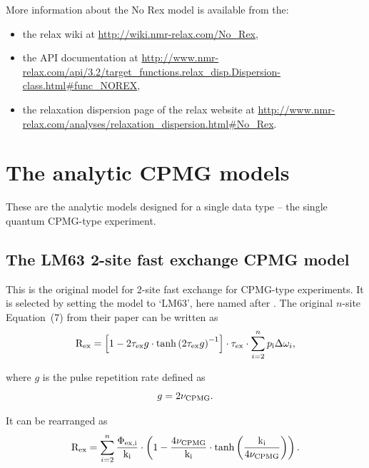 More information about the No Rex model is available from the:
\begin{itemize}
  \item the relax wiki at \url{http://wiki.nmr-relax.com/No\_Rex},
  \item the API documentation at \url{http://www.nmr-relax.com/api/3.2/target\_functions.relax\_disp.Dispersion-class.html#func\_NOREX},
  \item the relaxation dispersion page of the relax website at \url{http://www.nmr-relax.com/analyses/relaxation\_dispersion.html#No\_Rex}.
\end{itemize}




\section{The analytic CPMG models}
\label{sect: dispersion: analytic CPMG models}

These are the analytic models designed for a single data type -- the single quantum CPMG-type experiment.



\subsection{The LM63 2-site fast exchange CPMG model}
\label{sect: dispersion: LM63 model}

This is the original model for 2-site fast exchange for CPMG-type experiments.
It is selected by setting the model to `LM63', here named after \citet{LuzMeiboom63}.
The original $n$-site Equation~(7) from their paper can be written as
\begin{equation}
    \mathrm{R}_{\textrm{ex}} = \left[ 1 - 2\tau_{\textrm{ex}} g \cdot \tanh \left( 2\tau_{\textrm{ex}} g \right)^{-1} \right] \cdot \tau_{\textrm{ex}} \cdot \sum_{i=2}^n p_{\textrm{i}}\Delta\omega_{i},
\end{equation}

where $g$ is the pulse repetition rate defined as
\begin{equation}
    g = 2\nu_{\textrm{CPMG}}.
\end{equation}

It can be rearranged as
\begin{equation} \label{eq: Luz-Meiboom}
    \mathrm{R}_{\textrm{ex}} = \sum_{i=2}^n \frac{\Phi_{\textrm{ex,i}}}{\textrm{k}_{\textrm{i}}} \cdot \left( 1 - \frac{4\nu_{\textrm{CPMG}}}{\textrm{k}_{\textrm{i}}} \cdot \tanh \left( \frac{\textrm{k}_\textrm{i}}{4\nu_{\textrm{CPMG}}} \right) \right).
\end{equation}


